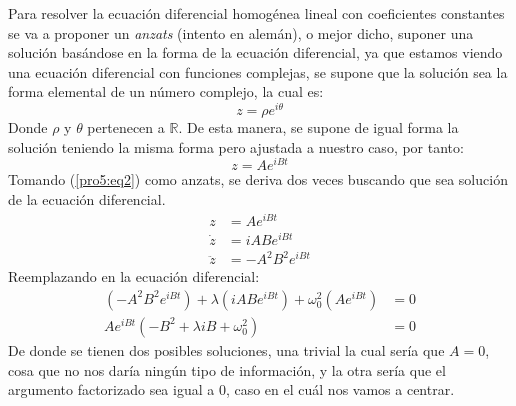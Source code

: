 \begin{multicols}{2}
Para resolver la ecuación diferencial homogénea lineal con coeficientes constantes se va a proponer un \textit{anzats} (intento en alemán), o mejor dicho, suponer una solución basándose en la forma de la ecuación diferencial, ya que estamos viendo una ecuación diferencial con funciones complejas, se supone que la solución sea la forma elemental de un número complejo, la cual es:
\begin{equation*}
    z = \rho e^{i\theta}
\end{equation*}
Donde $\rho$ y $\theta$ pertenecen a $\mathbb{R}$. De esta manera, se supone de igual forma la solución teniendo la misma forma pero ajustada a nuestro caso, por tanto:
\begin{equation}
    z = Ae^{iBt} \label{pro5:eq2}
\end{equation}
Tomando (\ref{pro5:eq2}) como anzats, se deriva dos veces buscando que sea solución de la ecuación diferencial.
\begin{align*}
    z &= Ae^{iBt}\\
    \dot{z} &= iABe^{iBt}\\
    \ddot{z} &= -A^{2}B^{2}e^{iBt}
\end{align*}
Reemplazando en la ecuación diferencial:
\begin{align*}
    \left(-A^{2}B^{2}e^{iBt}\right) + \lambda\left(iABe^{iBt}\right) + \omega_{0}^{2}\left(Ae^{iBt}\right) &= 0\\
    Ae^{iBt}\left(-B^{2} + \lambda iB + \omega_{0}^{2}\right) &= 0
\end{align*}
De donde se tienen dos posibles soluciones, una trivial la cual sería que $A = 0$, cosa que no nos daría ningún tipo de información, y la otra sería que el argumento factorizado sea igual a 0, caso en el cuál nos vamos a centrar.


\end{multicols}
